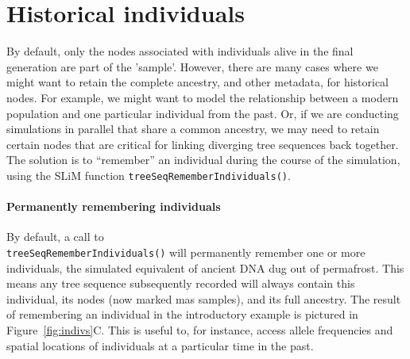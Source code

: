 \documentclass[12pt]{article}
\begin{document}
\section*{Historical individuals}
By default, only the nodes associated with individuals alive in the final generation are part of the 'sample'.
However, there are many cases where we might want to retain the complete ancestry, and other metadata, for
historical nodes. For example, we might want to model the relationship between a modern population and
one particular individual from the past.
Or, if we are conducting simulations in parallel that share 
a common ancestry, we may need to retain certain nodes that are critical for linking diverging
tree sequences back together.
The solution is to ``remember'' an individual during the course of the simulation,
using the SLiM function \verb|treeSeqRememberIndividuals()|.

\paragraph{Permanently remembering individuals}
By default, a call to \\ 
\verb|treeSeqRememberIndividuals()| will permanently remember one or more individuals,
the simulated equivalent of ancient DNA dug out of permafrost.
This means any tree sequence subsequently recorded will always contain this individual,
its nodes (now marked mas samples), and its full ancestry.
The result of remembering an individual in the introductory example is pictured
in Figure~\ref{fig:indivs}C.
This is useful to, for instance, access allele frequencies and spatial locations of individuals
at a particular time in the past.
\end{document}
